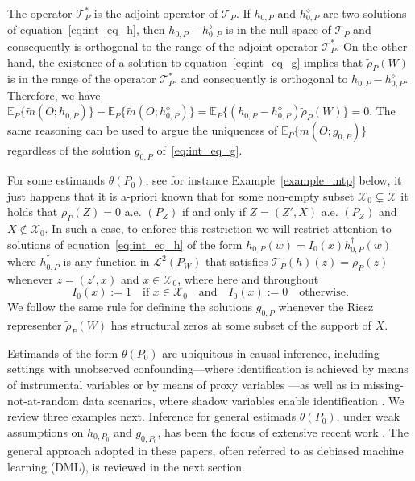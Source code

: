 \documentclass[twoside,11pt]{article}
\newcommand{\E}{\mathbb{E}}
\newcommand{\mc}{\mathcal}
\begin{document}
The operator $\mc{T}_P^*$ is the adjoint operator of $\mc{T}_P$. 
If $h_{0,P}$ and $h^\diamond_{0,P}$ are two solutions of equation~\eqref{eq:int_eq_h}, then $h_{0,P}-h^\diamond_{0,P}$ is in the null space of $\mc{T}_P$ and consequently is orthogonal to the range of the adjoint operator $\mc{T}_P^*$. On the other hand, the existence of a solution to equation~\eqref{eq:int_eq_g} implies that $\tilde{\rho}_P(W)$ is in the range of the operator $\mc{T}_P^*$, and consequently is orthogonal to  $h_{0,P}-h^\diamond_{0,P}$. Therefore, we have 
$\E_P\{\widetilde{m}(O;h_{0,P})\}-\E_P\{\widetilde{m}(O;h^\diamond_{0,P})\}=
\E_P\{(h_{0,P}-h^\diamond_{0,P}) \tilde{\rho}_P(W)\}=0.$  
The same reasoning can be used to argue the uniqueness of $\E_P\{ m(O;g_{0,P})\}$ regardless of the solution $g_{0,P}$ of~\eqref{eq:int_eq_g}.

For some estimands $\theta(P_0)$, see for instance Example~\ref{example_mtp}
below, it just happens that it is a-priori known that for some non-empty subset $\mc{X}_0\subsetneq\mc{X}$ it holds that $\rho_P(Z)=0$ a.e. $(P_Z)$ if and only if $Z= (Z', X)$ a.e. $(P_Z)$ and $X\notin\mc{X}_0$. In such a case, to enforce this restriction we will restrict attention to solutions of equation~\eqref{eq:int_eq_h} of the form  $h_{0,P} (w) = I_0(x) h_{0,P}^\dag (w) $ where  $h_{0,P}^\dag$ is any function in $\mc{L}^2(P_W)$ that satisfies $\mc{T}_P(h)(z)=\rho_P(z)$ whenever $z=(z',x)$ and $x \in \mc{X}_0$,  where here and throughout
\begin{equation*}
    I_0(x):=1\quad\text{if }x\in\mc{X}_0\quad\text{and}\quad I_0(x) := 0\quad\text{otherwise.}
\end{equation*}
We follow the same rule for defining the solutions $g_{0,P}$ whenever the Riesz representer $\tilde{\rho}_P(W)$ has structural zeros at some subset of the support of $X$.
 

Estimands of the form $\theta(P_0)$ are ubiquitous in causal inference, including settings with unobserved confounding---where identification is achieved by means of instrumental variables \citep{santos2011instrumental, severini2012efficiency, escanciano2013identification, freyberger2015identification} or by means of proxy variables \citep{miao2018identifying, tchetgen2020introduction, kallus2021causal, cui2024semiparametric}---as well as in missing-not-at-random data scenarios, where shadow variables enable identification \citep{miao2016varieties, li2023non, miao2024identification}. We review three examples next. Inference for general estimads $\theta(P_0)$, under weak assumptions on $h_{0,{P_0}}$ and $g_{0,{P_0}}$, has been the focus of extensive recent work \citep{ghassami2022minimax, bennett2022inference,chernozhukov2023simple, bennett2023source}. The general approach adopted in these papers, often referred to as debiased machine learning (DML), is reviewed in the next section. 
\end{document}
